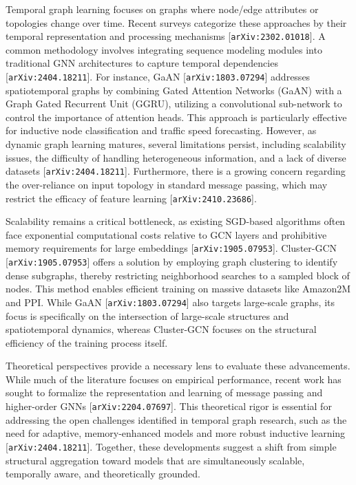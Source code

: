 \documentclass[11pt]{article}
\begin{document}
Temporal graph learning focuses on graphs where node/edge attributes or topologies change over time. Recent surveys categorize these approaches by their temporal representation and processing mechanisms [\texttt{arXiv:2302.01018}]. A common methodology involves integrating sequence modeling modules into traditional GNN architectures to capture temporal dependencies [\texttt{arXiv:2404.18211}]. For instance, GaAN [\texttt{arXiv:1803.07294}] addresses spatiotemporal graphs by combining Gated Attention Networks (GaAN) with a Graph Gated Recurrent Unit (GGRU), utilizing a convolutional sub-network to control the importance of attention heads. This approach is particularly effective for inductive node classification and traffic speed forecasting. However, as dynamic graph learning matures, several limitations persist, including scalability issues, the difficulty of handling heterogeneous information, and a lack of diverse datasets [\texttt{arXiv:2404.18211}]. Furthermore, there is a growing concern regarding the over-reliance on input topology in standard message passing, which may restrict the efficacy of feature learning [\texttt{arXiv:2410.23686}].

Scalability remains a critical bottleneck, as existing SGD-based algorithms often face exponential computational costs relative to GCN layers and prohibitive memory requirements for large embeddings [\texttt{arXiv:1905.07953}]. Cluster-GCN [\texttt{arXiv:1905.07953}] offers a solution by employing graph clustering to identify dense subgraphs, thereby restricting neighborhood searches to a sampled block of nodes. This method enables efficient training on massive datasets like Amazon2M and PPI. While GaAN [\texttt{arXiv:1803.07294}] also targets large-scale graphs, its focus is specifically on the intersection of large-scale structures and spatiotemporal dynamics, whereas Cluster-GCN focuses on the structural efficiency of the training process itself.

Theoretical perspectives provide a necessary lens to evaluate these advancements. While much of the literature focuses on empirical performance, recent work has sought to formalize the representation and learning of message passing and higher-order GNNs [\texttt{arXiv:2204.07697}]. This theoretical rigor is essential for addressing the open challenges identified in temporal graph research, such as the need for adaptive, memory-enhanced models and more robust inductive learning [\texttt{arXiv:2404.18211}]. Together, these developments suggest a shift from simple structural aggregation toward models that are simultaneously scalable, temporally aware, and theoretically grounded.
\end{document}

